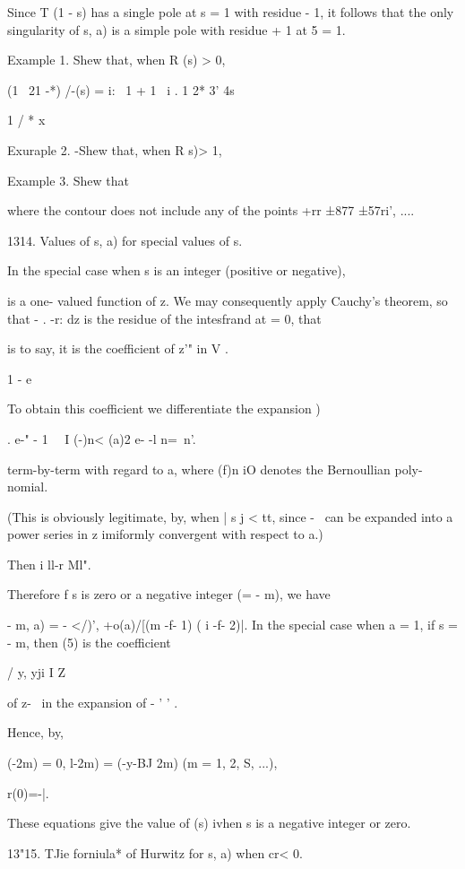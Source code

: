 Since T (1 - s) has a single pole at s = 1 with residue - 1, it
follows that the only singularity of s, a) is a simple pole with
residue + 1 at 5 = 1.

Example 1. Shew that, when R (s) > 0,

(1 \ 21 -*) /-(s) = i: \ 1 + 1 \ i . 1 2* 3' 4s ~

1 / * x ~

Exuraple 2. -Shew that, when R s)> 1,

Example 3. Shew that

where the contour does not include any of the points +rr ±877 ±57ri',
....

1314. Values of s, a) for special values of s.

In the special case when s is an integer (positive or negative),

is a one- valued function of z. We may consequently apply Cauchy's
theorem, so that - . -r: dz is the residue of the intesfrand at = 0,
that

is to say, it is the coefficient of z'" in V .

1 - e~

To obtain this coefficient we differentiate the expansion )

. e-" - 1 \ \ I (-)n< (a)2 e- -l n=\ n'.

term-by-term with regard to a, where (f)n iO denotes the Bernoullian
poly- nomial.

(This is obviously legitimate, by, when | s j < tt, since - \,
can be expanded into a power series in z imiformly convergent with
respect to a.)

Then i ll-r Ml".

Therefore f s is zero or a negative integer (= - m), we have

  - m, a) = - </)', +o(a)/[(m -f- 1) ( i -f- 2)|. In the special case
when a = 1, if s = - m, then (5) is the coefficient

/ y, yji I Z

of z-~ in the expansion of - ' ' .

%
%

Hence, by,

 (-2m) = 0, l-2m) = (-y-BJ 2m) (m = 1, 2, S, ...),

r(0)=-|.

These equations give the value of (s) ivhen s is a negative integer or
zero.

13"15. TJie forniula* of Hurwitz for s, a) when cr< 0.

